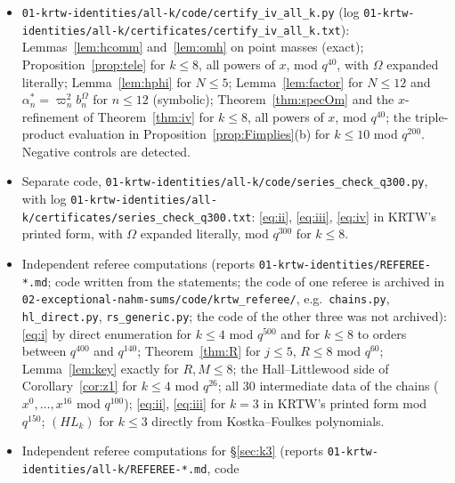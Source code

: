 \documentclass[11pt]{amsart}
\theoremstyle{definition}
\numberwithin{equation}{section}
\newcommand{\fpath}[1]{\nolinkurl{#1}}
\begin{document}
\begin{itemize}[leftmargin=1.5em]
two rational points; (B-v) symbolically; the eigen-relations of Lemma~\ref{lem:HGeig} and of $H'^\sharp$, $G^\sharp$ on
eigenvectors computed independently from the triangular systems of $T$ and $T^\sharp$; Corollaries~\ref{cor:V}
and~\ref{cor:Vsharp} against those eigenvectors ($N\le7$); Propositions~\ref{prop:Arec} and~\ref{prop:vsharp}
($N\le8$); Lemma~\ref{lem:biorth} (all pairs with $N\le3$); Lemma~\ref{lem:prod} ($N\le8$); Theorem~\ref{thm:F} for
$k\le6$, all powers of $x$, mod $q^{30}$; the expansion of $u$ in Theorem~\ref{thm:spec}. Negative controls are
detected.
\item \fpath{01-krtw-identities/all-k/code/certify_iv_all_k.py} (log \fpath{01-krtw-identities/all-k/certificates/certify_iv_all_k.txt}):
Lemmas~\ref{lem:hcomm} and~\ref{lem:omh} on point masses (exact); Proposition~\ref{prop:tele} for $k\le8$, all powers
of $x$, mod $q^{40}$, with $\Omega$ expanded literally; Lemma~\ref{lem:hphi} for $N\le5$; Lemma~\ref{lem:factor} for
$N\le12$ and $\alpha^*_n=\varpi_n^2b^\Omega_n$ for $n\le12$ (symbolic); Theorem~\ref{thm:specOm} and the $x$-refinement of
Theorem~\ref{thm:iv} for $k\le8$, all powers of $x$, mod $q^{40}$; the triple-product evaluation in
Proposition~\ref{prop:Fimplies}(b) for $k\le10$ mod $q^{200}$. Negative controls are detected.
\item Separate code, \fpath{01-krtw-identities/all-k/code/series_check_q300.py}, with log
\fpath{01-krtw-identities/all-k/certificates/series_check_q300.txt}: \eqref{eq:ii}, \eqref{eq:iii}, \eqref{eq:iv} in KRTW's
printed form, with $\Omega$ expanded literally, mod $q^{300}$ for $k\le8$.
\item Independent referee computations (reports \fpath{01-krtw-identities/REFEREE-*.md}; code written
from the statements; the code of one referee is archived in \fpath{02-exceptional-nahm-sums/code/krtw_referee/},
e.g.\ \fpath{chains.py}, \fpath{hl_direct.py}, \fpath{rs_generic.py}; the code of the other three was not
archived): \eqref{eq:i} by direct enumeration for $k\le4$ mod $q^{500}$ and for $k\le8$ to
orders between $q^{400}$ and $q^{140}$; Theorem~\ref{thm:R} for $j\le5$, $R\le8$ mod $q^{60}$;
Lemma~\ref{lem:key} exactly for $R,M\le8$; the Hall--Littlewood side of Corollary~\ref{cor:z1} for
$k\le4$ mod $q^{26}$; all $30$ intermediate data of the chains ($x^0,\dots,x^{16}$ mod $q^{100}$);
\eqref{eq:ii}, \eqref{eq:iii} for $k=3$ in KRTW's printed form mod $q^{150}$; $(HL_k)$ for $k\le3$ directly
from Kostka--Foulkes polynomials.
\item Independent referee computations for §\ref{sec:k3} (reports \fpath{01-krtw-identities/all-k/REFEREE-*.md}, code

\end{itemize}
\end{document}
